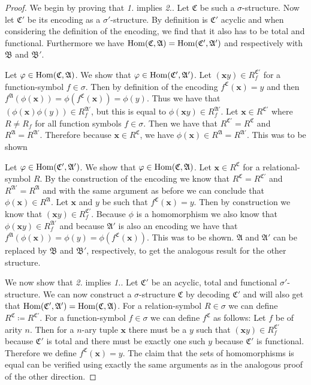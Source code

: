 \begin{proof}
	We begin by proving that \emph{1.} implies \emph{2.}.
	Let $\mathfrak C$ be such a $\sigma$-structure.
	Now let $\mathfrak C'$ be its encoding as a $\sigma'$-structure.
	By definition is $\mathfrak C'$ acyclic and when considering the definition of the encoding, we find that it also has to be total and functional.
	Furthermore we have $\operatorname{Hom}(\mathfrak C,\mathfrak A)=\operatorname{Hom}(\mathfrak C',\mathfrak A')$ and respectively with $\mathfrak B$ and $\mathfrak B'$.
	
	Let $\varphi\in\operatorname{Hom}(\mathfrak C,\mathfrak A)$. 
	We show that $\varphi\in\operatorname{Hom}(\mathfrak C',\mathfrak A')$.
	Let $(\mathbf xy)\in R^{\mathfrak C'}_f$ for a function-symbol $f\in\sigma$.
	Then by definition of the encoding $f^{\mathfrak C}(\mathbf x)=y$ and then $f^{\mathfrak A}(\phi(\mathbf x))=\phi(f^{\mathfrak C}(\mathbf x))=\phi(y)$.
	Thus we have that $(\phi(\mathbf x)\phi(y))\in R_f^{\mathfrak A'}$, but this is equal to $\phi(\mathbf xy)\in R_f^{\mathfrak A'}$.
	Let $\mathbf x\in R^{\mathfrak C'}$ where $R\neq R_f$ for all function symbols $f\in\sigma$.
	Then we have that $R^{\mathfrak C'}=R^{\mathfrak C}$ and $R^{\mathfrak A}=R^{\mathfrak A'}$. 
	Therefore because $\mathbf x\in R^{\mathfrak C}$, we have $\phi(\mathbf x)\in R^{\mathfrak A}=R^{\mathfrak A'}$. 
	This was to be shown
	
	Let $\varphi\in \operatorname{Hom}(\mathfrak C',\mathfrak A')$.
	We show that $\varphi\in\operatorname{Hom}(\mathfrak C,\mathfrak A)$.
	Let $\mathbf x\in R^{\mathfrak C}$ for a relational-symbol $R$.
	By the construction of the encoding we know that $R^{\mathfrak C}=R^{\mathfrak C'}$ and $R^{\mathfrak A'}=R^{\mathfrak A}$ and with the same argument as before we can conclude that $\phi(\mathbf x)\in R^{\mathfrak A}$.
	Let $\mathbf x$ and $y$ be such that $f^{\mathfrak C}(\mathbf x)=y$.
	Then by construction we know that $(\mathbf xy)\in R_f^{\mathfrak C'}$.
	Because $\phi$ is a homomorphism we also know that $\phi(\mathbf xy)\in R_f^{\mathfrak A'}$ and because $\mathfrak A'$ is also an encoding we have that $f^{\mathfrak A}(\phi(\mathbf x))=\phi(y)=\phi(f^{\mathfrak C}(\mathbf x))$.
	This was to be shown.
	$\mathfrak A$ and $\mathfrak A'$ can be replaced by $\mathfrak B$ and $\mathfrak B'$, respectively, to get the analogous result for the other structure.
	
	We now show that \emph{2.} implies \emph{1.}.
	Let $\mathfrak C'$ be an acyclic, total and functional $\sigma'$-structure.
	We can now construct a $\sigma$-structure $\mathfrak C$ by decoding $\mathfrak C'$ and will also get that $\operatorname{Hom}(\mathfrak C',\mathfrak A')=\operatorname{Hom}(\mathfrak C,\mathfrak A)$.
	For a relation-symbol $R\in\sigma$ we can define $R^{\mathfrak C}\coloneqq R^{\mathfrak C'}$.
	For a function-symbol $f\in\sigma$ we can define $f^{\mathfrak C}$ as follows: 
	Let $f$ be of arity $n$. Then for a $n$-ary tuple $\mathbf x$ there must be a $y$ such that $(\mathbf xy)\in R_f^{\mathfrak C'}$ because $\mathfrak C'$ is total and there must be exactly one such $y$ because $\mathfrak C'$ is functional.
	Therefore we define $f^{\mathfrak C}(\mathbf x)=y$.
	The claim that the sets of homomorphisms is equal can be verified using exactly the same arguments as in the analogous proof of the other direction.
\end{proof}

